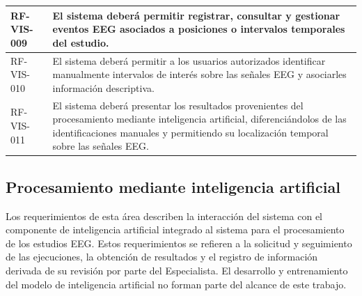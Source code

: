 \begin{longtable}{|p{}|p{}|}
    RF-VIS-009 &
    El sistema deberá permitir registrar, consultar y gestionar eventos EEG
    asociados a posiciones o intervalos temporales del estudio. \\
    \hline

    RF-VIS-010 &
    El sistema deberá permitir a los usuarios autorizados identificar
    manualmente intervalos de interés sobre las señales EEG y asociarles
    información descriptiva. \\
    \hline

    RF-VIS-011 &
    El sistema deberá presentar los resultados provenientes del procesamiento
    mediante inteligencia artificial, diferenciándolos de las identificaciones
    manuales y permitiendo su localización temporal sobre las señales EEG. \\
    \hline
\end{longtable}


\subsection{Procesamiento mediante inteligencia artificial}
\label{subsec:rf-ia}

Los requerimientos de esta área describen la interacción del sistema con el
componente de inteligencia artificial integrado al sistema para el
procesamiento de los estudios EEG. Estos requerimientos se refieren a la
solicitud y seguimiento de las ejecuciones, la obtención de resultados y el
registro de información derivada de su revisión por parte del Especialista.
El desarrollo y entrenamiento del modelo de inteligencia artificial no forman
parte del alcance de este trabajo.

